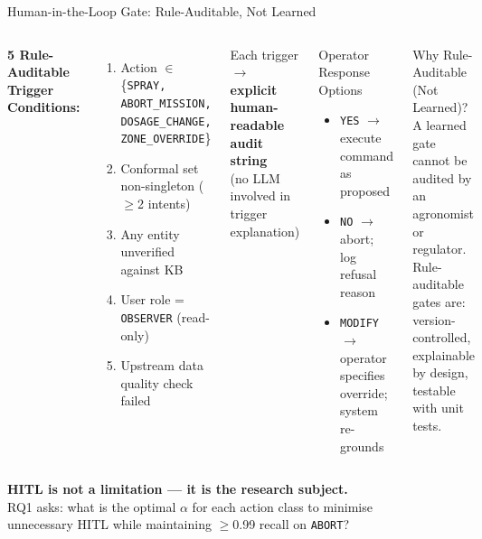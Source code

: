\documentclass[aspectratio=169,10pt]{beamer}
\begin{document}
\begin{frame}{Human-in-the-Loop Gate: Rule-Auditable, Not Learned}

\begin{columns}[T]
\textbf{5 Rule-Auditable Trigger Conditions:}
\begin{enumerate}\small
  \item Action $\in$ \{\texttt{SPRAY, ABORT\_MISSION,}\\ \texttt{DOSAGE\_CHANGE, ZONE\_OVERRIDE}\}
  \item Conformal set non-singleton ($\geq$2 intents)
  \item Any entity unverified against KB
  \item User role = \texttt{OBSERVER} (read-only)
  \item Upstream data quality check failed
\end{enumerate}

\medskip
\small Each trigger $\to$ \textbf{explicit human-readable audit string}\\
(no LLM involved in trigger explanation)

\begin{block}{Operator Response Options}
\begin{itemize}\small
  \item \texttt{YES} $\to$ execute command as proposed
  \item \texttt{NO} $\to$ abort; log refusal reason
  \item \texttt{MODIFY} $\to$ operator specifies override; system re-grounds
\end{itemize}
\end{block}

\medskip
\begin{block}{Why Rule-Auditable (Not Learned)?}
\small
A learned gate cannot be audited by an agronomist or regulator. \\
Rule-auditable gates are: version-controlled, explainable by design, testable with unit tests.
\end{block}

\end{columns}

\medskip
\begin{center}
\small
\textbf{HITL is not a limitation --- it is the research subject.} \\
RQ1 asks: what is the optimal $\alpha$ for each action class to minimise\\ 
unnecessary HITL while maintaining $\geq$0.99 recall on \texttt{ABORT}?
\end{center}

\end{frame}
\end{document}
